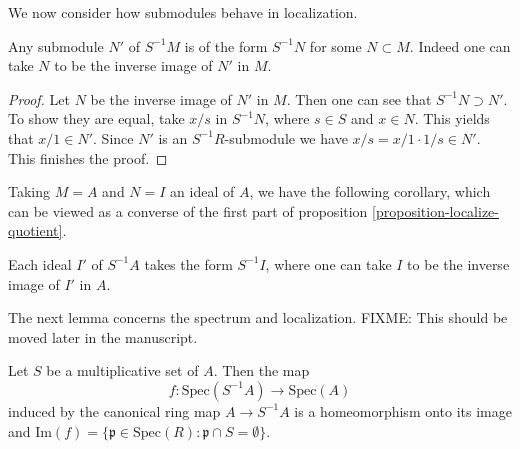 \noindent
We now consider how submodules behave in localization.

\begin{lemma}
\label{lemma-submodule-localization}
Any submodule $N'$ of $S^{-1}M$ is of the form $S^{-1}N$ for some
$N\subset M$. Indeed one can take $N$ to be the inverse image of
$N'$ in $M$.
\end{lemma}

\begin{proof}
Let $N$ be the inverse image of $N'$ in $M$. Then one can see that
$S^{-1}N\supset N'$. To show they are equal, take $x/s$ in
$S^{-1}N$, where $s\in S$ and $x\in N$. This yields that $x/1\in
N'$. Since $N'$ is an $S^{-1}R$-submodule we have
$x/s = x/1\cdot 1/s\in N'$. This finishes the proof.
\end{proof}

\noindent
Taking $M = A$ and $N = I$ an ideal of $A$, we have the following
corollary, which can be viewed as a converse of the first part of
proposition \ref{proposition-localize-quotient}.

\begin{lemma}
Each ideal $I'$ of $S^{-1}A$ takes the form $S^{-1}I$, where one can
take $I$ to be the inverse image of $I'$ in $A$.
\end{lemma}

\noindent
The next lemma concerns the spectrum and localization.
FIXME: This should be moved later in the manuscript.

\begin{lemma}
Let $S$ be a multiplicative set of $A$. Then the map
$$
f: \text{Spec}(S^{-1}A)\longrightarrow \text{Spec}(A)
$$
induced by the canonical ring map
$A \rightarrow S^{-1}A$ is a homeomorphism onto its image and
$\text{Im}(f)=
\{ \mathfrak p\in \text{Spec}(R): \mathfrak p\cap S = \emptyset \}$.
\end{lemma}

